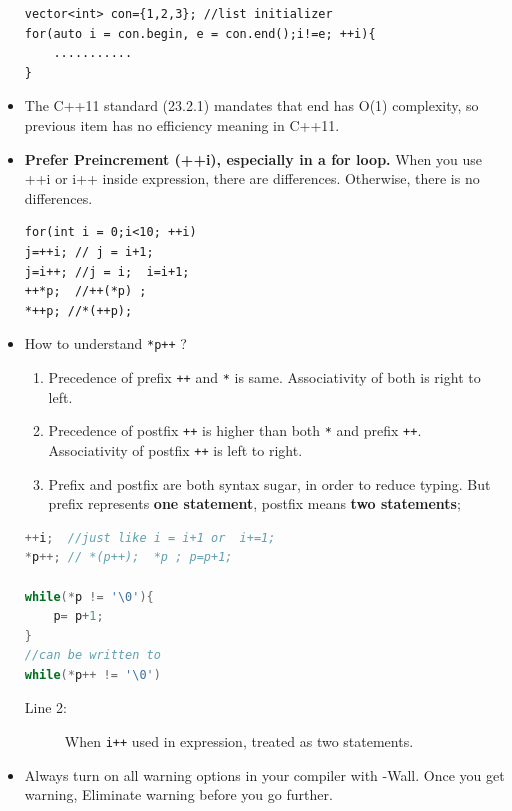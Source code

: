 \documentclass[a4paper,11pt,twoside]{book}
\begin{document}
\begin{itemize}
\begin{lstlisting}[numbers=none]
vector<int> con={1,2,3}; //list initializer
for(auto i = con.begin, e = con.end();i!=e; ++i){
	...........
}
\end{lstlisting}
	
	\item The C++11 standard (23.2.1) mandates that end has O(1) complexity, so previous item has no efficiency meaning in C++11.
	
	
	\item \textbf{Prefer Preincrement (++i), especially in a for loop.}  When you use ++i or i++ inside expression, there are differences. Otherwise, there is no differences.
	
\begin{lstlisting}[numbers=none]
for(int i = 0;i<10; ++i)
j=++i; // j = i+1;
j=i++; //j = i;  i=i+1;
++*p;  //++(*p) ;
*++p; //*(++p);
\end{lstlisting}
	
	\item How to understand \texttt{*p++} ?
	
	\begin{enumerate}
		\item Precedence of prefix \texttt{++} and \texttt{*} is same. Associativity of both is right to left.
		\item Precedence of postfix \texttt{++} is higher than both \texttt{*} and prefix \texttt{++}. Associativity of postfix \texttt{++} is left to right.
		\item Prefix and postfix are both syntax sugar, in order to reduce typing.   But prefix represents \textbf{one statement}, postfix means \textbf{two statements};
	\end{enumerate}
	
\begin{lstlisting}[frame=single, language=c++]
++i;  //just like i = i+1 or  i+=1;
*p++; // *(p++);  *p ; p=p+1;

while(*p != '\0'){
	p= p+1;
}
//can be written to
while(*p++ != '\0')
\end{lstlisting}
\begin{description}
	\item[Line 2:] When \texttt{i++} used in expression, treated as two statements.
\end{description}
	
	\item Always turn on all warning options in your compiler with -Wall. Once you get warning, Eliminate warning before you go further.
	

\end{itemize}
\end{document}
